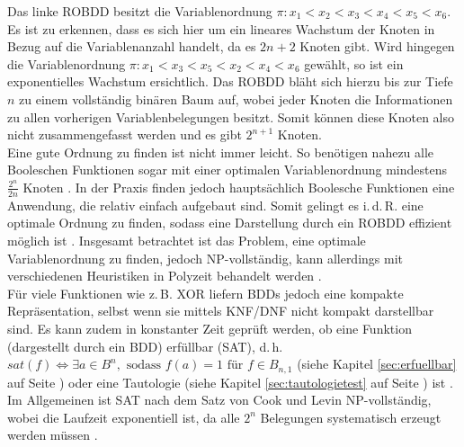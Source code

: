 Das linke ROBDD besitzt die Variablenordnung $\pi : x_1 < x_2 < x_3 < x_4 < x_5 < x_6$. Es ist zu erkennen, dass es sich hier um ein lineares Wachstum der Knoten in Bezug auf die Variablenanzahl handelt, da es $2n+2$ Knoten gibt. Wird hingegen die Variablenordnung $\pi : x_1 < x_3 < x_5 < x_2 < x_4 < x_6$ gewählt, so ist ein exponentielles Wachstum ersichtlich. Das ROBDD bläht sich hierzu bis zur Tiefe $n$ zu einem vollständig binären Baum auf, wobei jeder Knoten die Informationen zu allen vorherigen Variablenbelegungen besitzt. Somit können diese Knoten also nicht zusammengefasst werden und es gibt $2^{n+1}$ Knoten.\\
Eine gute Ordnung zu finden ist nicht immer leicht. So benötigen nahezu alle Booleschen Funktionen sogar mit einer optimalen Variablenordnung mindestens $\frac{2^n}{2n}$ Knoten \cite{ll92}. In der Praxis finden jedoch hauptsächlich Boolesche Funktionen eine Anwendung, die relativ einfach aufgebaut sind. Somit gelingt es i.\,d.\,R. eine optimale Ordnung zu finden, sodass eine Darstellung durch ein ROBDD effizient möglich ist \cite{g2002}. Insgesamt betrachtet ist das Problem, eine optimale Variablenordnung zu finden, jedoch NP-vollständig, kann allerdings mit verschiedenen Heuristiken in Polyzeit behandelt werden \cite{bw1999}.\\
Für viele Funktionen wie z.\,B. XOR liefern BDDs jedoch eine kompakte Repräsentation, selbst wenn sie mittels KNF/DNF nicht kompakt darstellbar sind. Es kann zudem in konstanter Zeit geprüft werden, ob eine Funktion (dargestellt durch ein BDD) erfüllbar (SAT), d.\,h. $sat(f) \Leftrightarrow \exists a \in B^n, \text{ sodass } f(a) = 1 \text{ für } f \in B_{n,1}$ (siehe Kapitel \ref{sec:erfuellbar} auf Seite \pageref{sec:erfuellbar}) oder eine Tautologie (siehe Kapitel \ref{sec:tautologietest} auf Seite \pageref{sec:tautologietest}) ist \cite{bfms2001}. Im Allgemeinen ist SAT nach dem Satz von Cook und Levin NP-vollständig, wobei die Laufzeit exponentiell ist, da alle $2^n$ Belegungen systematisch erzeugt werden müssen \cite{km2007}.
